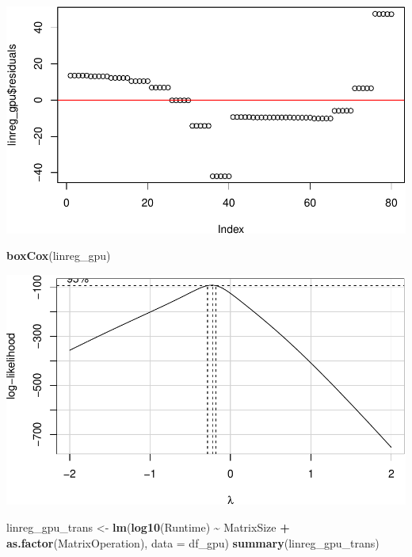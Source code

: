 \documentclass[
]{article}
\newenvironment{Shaded}{\begin{snugshade}}{\end{snugshade}}
\newcommand{\DataTypeTok}[1]{\textcolor[rgb]{0.13,0.29,0.53}{#1}}
\newcommand{\DecValTok}[1]{\textcolor[rgb]{0.00,0.00,0.81}{#1}}
\newcommand{\KeywordTok}[1]{\textcolor[rgb]{0.13,0.29,0.53}{\textbf{#1}}}
\newcommand{\NormalTok}[1]{#1}
\newcommand{\OperatorTok}[1]{\textcolor[rgb]{0.81,0.36,0.00}{\textbf{#1}}}
\newcommand{\StringTok}[1]{\textcolor[rgb]{0.31,0.60,0.02}{#1}}
\begin{document}
\begin{Shaded}
\end{Shaded}

\includegraphics{main_files/figure-latex/unnamed-chunk-12-1.pdf}

\begin{Shaded}
\begin{Highlighting}[]
\KeywordTok{boxCox}\NormalTok{(linreg\_gpu)}
\end{Highlighting}
\end{Shaded}

\includegraphics{main_files/figure-latex/unnamed-chunk-12-2.pdf}

\begin{Shaded}
\begin{Highlighting}[]
\NormalTok{linreg\_gpu\_trans \textless{}{-}}\StringTok{ }\KeywordTok{lm}\NormalTok{(}\KeywordTok{log10}\NormalTok{(Runtime) }\OperatorTok{\textasciitilde{}}\StringTok{ }\NormalTok{MatrixSize }\OperatorTok{+}
\StringTok{                         }\KeywordTok{as.factor}\NormalTok{(MatrixOperation), }\DataTypeTok{data =}\NormalTok{ df\_gpu)}
\KeywordTok{summary}\NormalTok{(linreg\_gpu\_trans)}
\end{Highlighting}
\end{Shaded}
\end{document}
